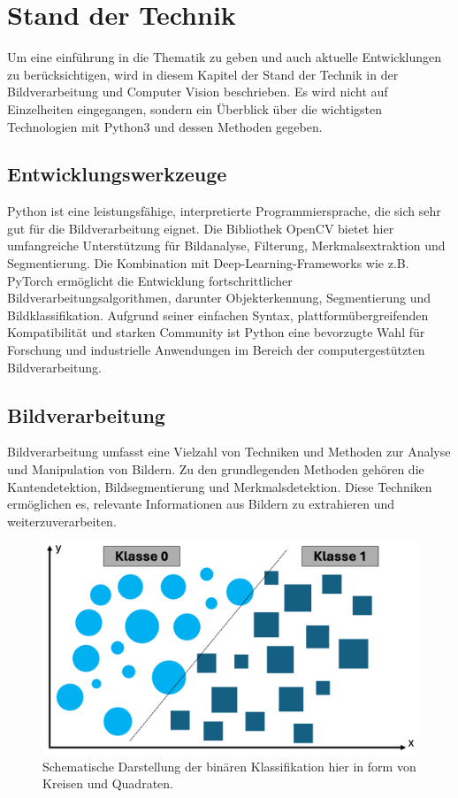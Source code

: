 \documentclass[journal,twoside,web]{ieeecolor}
\begin{document}
\section{Stand der Technik}
\label{sec:state_of_the_art}
Um eine einführung in die Thematik zu geben und auch aktuelle Entwicklungen zu berücksichtigen, wird in diesem Kapitel der Stand der Technik in der Bildverarbeitung und Computer Vision beschrieben. Es wird nicht auf Einzelheiten eingegangen, sondern ein Überblick über die wichtigsten Technologien mit Python3 und dessen Methoden gegeben.

\subsection{Entwicklungswerkzeuge}
\label{sec:tools}
Python ist eine leistungsfähige, interpretierte Programmiersprache, die sich sehr gut für die Bildverarbeitung eignet. Die Bibliothek OpenCV bietet hier umfangreiche Unterstützung für Bildanalyse, Filterung, Merkmalsextraktion und Segmentierung. Die Kombination mit Deep-Learning-Frameworks wie z.B. PyTorch ermöglicht die Entwicklung fortschrittlicher Bildverarbeitungsalgorithmen, darunter Objekterkennung, Segmentierung und Bildklassifikation. Aufgrund seiner einfachen Syntax, plattformübergreifenden Kompatibilität und starken Community ist Python eine bevorzugte Wahl für Forschung und industrielle Anwendungen im Bereich der computergestützten Bildverarbeitung.

\subsection{Bildverarbeitung}
\label{sec:image_processing}
Bildverarbeitung umfasst eine Vielzahl von Techniken und Methoden zur Analyse und Manipulation von Bildern. Zu den grundlegenden Methoden gehören die Kantendetektion, Bildsegmentierung und Merkmalsdetektion. Diese Techniken ermöglichen es, relevante Informationen aus Bildern zu extrahieren und weiterzuverarbeiten. 

\begin{figure}[H]
    \centerline{\includegraphics[width=\columnwidth]{binaere_klassifikation.png}}
    \caption{Schematische Darstellung der binären Klassifikation hier in form von Kreisen und Quadraten.}
    \label{fig:bin_class}
\end{figure}
\end{document}

